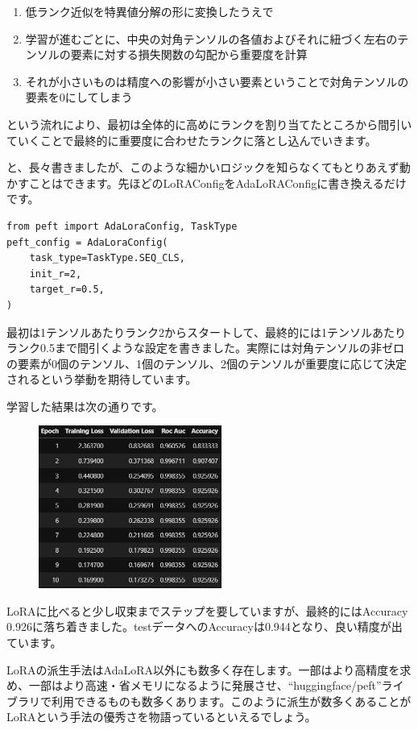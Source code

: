 \documentclass[a5paper,twoside,dvipdfmx]{jsarticle}
\begin{document}
\begin{enumerate}
  \item 低ランク近似を特異値分解の形に変換したうえで
  \item 学習が進むごとに、中央の対角テンソルの各値およびそれに紐づく左右のテンソルの要素に対する損失関数の勾配から重要度を計算
  \item それが小さいものは精度への影響が小さい要素ということで対角テンソルの要素を0にしてしまう
\end{enumerate}

という流れにより、最初は全体的に高めにランクを割り当てたところから間引いていくことで最終的に重要度に合わせたランクに落とし込んでいきます。

と、長々書きましたが、このような細かいロジックを知らなくてもとりあえず動かすことはできます。先ほどのLoRAConfigをAdaLoRAConfigに書き換えるだけです。

\begin{lstlisting}
from peft import AdaLoraConfig, TaskType
peft_config = AdaLoraConfig(
    task_type=TaskType.SEQ_CLS,
    init_r=2,
    target_r=0.5,
)
\end{lstlisting}

最初は1テンソルあたりランク2からスタートして、最終的には1テンソルあたりランク0.5まで間引くような設定を書きました。実際には対角テンソルの非ゼロの要素が0個のテンソル、1個のテンソル、2個のテンソルが重要度に応じて決定されるという挙動を期待しています。

学習した結果は次の通りです。


\begin{figure}[h]
  \centering
  \includegraphics[width=60mm]{../C105Fig/gray/adalora_train.png}
 \end{figure} 

LoRAに比べると少し収束までステップを要していますが、最終的にはAccuracy 0.926に落ち着きました。testデータへのAccuracyは0.944となり、良い精度が出ています。

LoRAの派生手法はAdaLoRA以外にも数多く存在します。一部はより高精度を求め、一部はより高速・省メモリになるように発展させ、``huggingface/peft''ライブラリで利用できるものも数多くあります。このように派生が数多くあることがLoRAという手法の優秀さを物語っているといえるでしょう。
\end{document}
